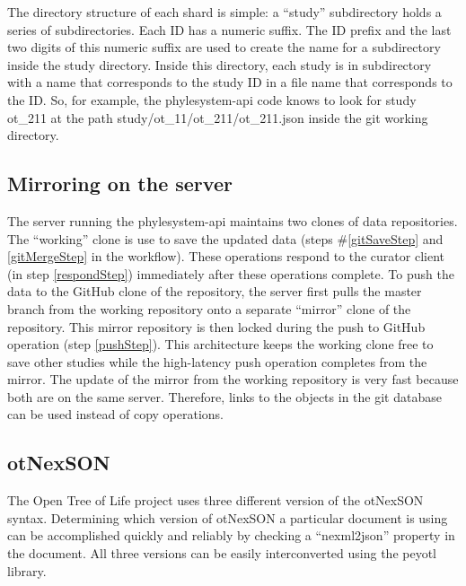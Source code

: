 \documentclass{bioinfo}
\newcommand{\ps}{phylesystem\xspace}
\newcommand{\otol}{Open Tree of Life\xspace}
\newcommand{\nexson}{otNexSON\xspace}
\begin{document}
\begin{methods}
The directory structure of each shard is simple: a ``study'' subdirectory holds 
a series of subdirectories.
Each ID has a numeric suffix.
The ID prefix and the last two digits of this numeric suffix are used to create the name
    for a subdirectory inside the study directory.
Inside this directory, each study is in subdirectory with a name that corresponds to the study ID
    in a file name that corresponds to the ID.
So, for example, the \ps-api code knows to look for study ot\_211 at the path
    study/ot\_11/ot\_211/ot\_211.json inside the git working directory.
\subsection*{Mirroring on the server}
The server running the \ps-api maintains two clones of data repositories.
The ``working'' clone is use to save the updated data (steps \#\ref{gitSaveStep} and \ref{gitMergeStep}  in the workflow).
These operations respond to the curator client (in step \ref{respondStep}) immediately
    after these operations complete.
To push the data to the GitHub clone of the repository, the server first pulls the master branch from the working repository onto a separate
    ``mirror'' clone of the repository.
This mirror repository is then locked during the push to GitHub operation (step \ref{pushStep}).
This architecture keeps the working clone free to save other studies while the high-latency push operation completes from the mirror.
The update of the mirror from the working repository is very fast because both are on the same server.
Therefore, links to the objects in the git database can be used instead of copy operations.

\subsection*{\nexson}
The \otol project uses three different version of the \nexson syntax.
Determining which version of \nexson a particular document is using
    can be accomplished quickly and reliably by checking a  ``nexml2json'' property in the document.
All three versions can be easily interconverted using the peyotl library.


\end{methods}
\end{document}

